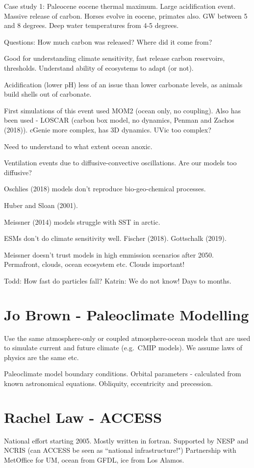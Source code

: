 \documentclass[12pt]{article}
\begin{document}
Case study 1: Paleocene eocene thermal maximum. Large acidification event. Massive release of carbon. Horses evolve in eocene, primates also. GW between 5 and 8 degrees. Deep water temperatures from 4-5 degrees. 

Questions: How much carbon was released? Where did it come from? 

Good for understanding climate sensitivity, fast release carbon reservoirs, thresholds. Understand ability of ecosystems to adapt (or not). 

Acidification (lower pH) less of an issue than lower carbonate levels, as animals build shells out of carbonate. 

First simulations of this event used MOM2 (ocean only, no coupling). Also has been used - LOSCAR (carbon box model, no dynamics, Penman and Zachos (2018)). cGenie more complex, has 3D dynamics. UVic too complex? 

Need to understand to what extent ocean anoxic. 

Ventilation events due to diffusive-convective oscillations. Are our models too diffusive?

Oschlies (2018) models don't reproduce bio-geo-chemical processes. 

Huber and Sloan (2001).

Meissner (2014) models struggle with SST in arctic.

ESMs don't do climate sensitivity well. Fischer (2018). Gottschalk (2019).

Meissner doesn't trust models in high emmission scenarios after 2050. Permafront, clouds, ocean ecosystem etc. Clouds important!

Todd: How fast do particles fall? Katrin: We do not know! Days to months. 

\section{Jo Brown - Paleoclimate Modelling}
Use the same atmosphere-only or coupled atmosphere-ocean models that are used to simulate current and future climate (e.g.~CMIP models). We assume laws of physics are the same etc.

Paleoclimate model boundary conditions. Orbital parameters - calculated from known astronomical equations. Obliquity, eccentricity and precession. 

\section{Rachel Law - ACCESS}
National effort starting 2005. Mostly written in fortran. Supported by NESP and NCRIS (can ACCESS be seen as ``national infrastructure!") Partnership with MetOffice for UM, ocean from GFDL, ice from Los Alamos. 
\end{document}
